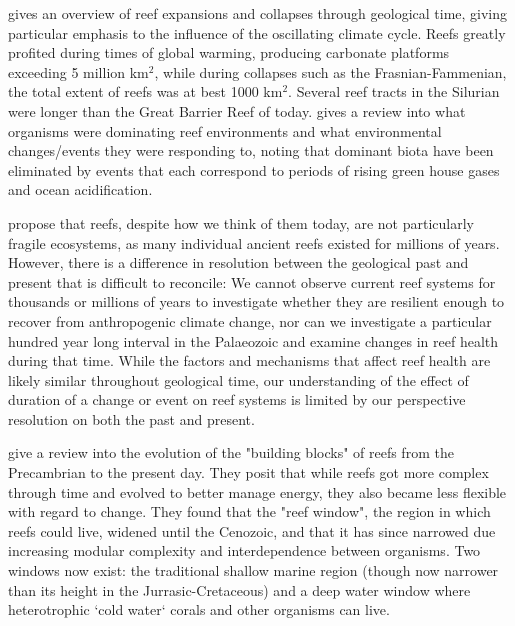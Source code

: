 \documentclass[11pt,a4paper]{article}
\begin{document}
\cite{Copper1994} gives an overview of reef expansions and collapses through geological time, giving particular emphasis to the influence of the oscillating climate cycle.
 Reefs greatly profited during times of global warming, producing carbonate platforms exceeding 5 million km$^{2}$, while during collapses such as the Frasnian-Fammenian, the total extent of reefs was at best 1000 km$^{2}$.
 Several reef tracts in the Silurian were longer than the Great Barrier Reef of today.
 \cite{Lipps2016} gives a review into what organisms were dominating reef environments and what environmental changes/events they were responding to, noting that dominant biota have been eliminated by events that each correspond to periods of rising green house gases and ocean acidification.

\cite{Lipps2016} propose that reefs, despite how we think of them today, are not particularly fragile ecosystems, as many individual ancient reefs existed for millions of years.
 However, there is a difference in resolution between the geological past and present that is difficult to reconcile: We cannot observe current reef systems for thousands or millions of years to investigate whether they are resilient enough to recover from anthropogenic climate change, nor can we investigate a particular hundred year long interval in the Palaeozoic and examine changes in reef health during that time.
 While the factors and mechanisms that affect reef health are likely similar throughout geological time, our understanding of the effect of duration of a change or event on reef systems is limited by our perspective resolution on both the past and present.

\cite{Leinfelder1999} give a review into the evolution of the "building blocks" of reefs from the Precambrian to the present day.
 They posit that while reefs got more complex through time and evolved to better manage energy, they also became less flexible with regard to change.
 They found that the "reef window", the region in which reefs could live, widened until the Cenozoic, and that it has since narrowed due increasing modular complexity and interdependence between organisms.
 Two windows now exist: the traditional shallow marine region (though now narrower than its height in the Jurrasic-Cretaceous) and a deep water window where heterotrophic `cold water` corals and other organisms can live. %
\end{document}
